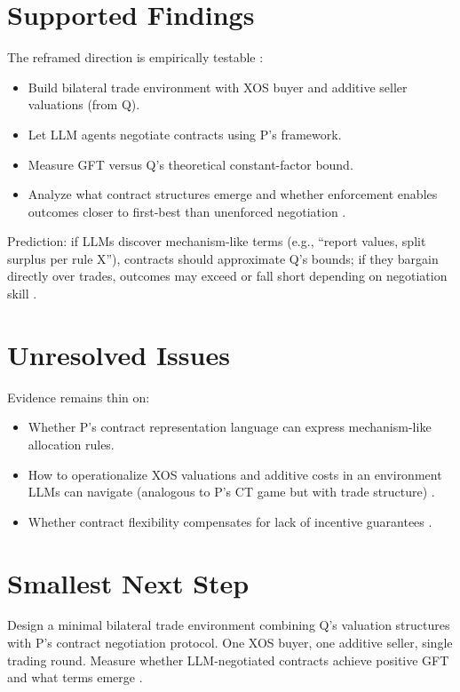\documentclass{article}
\begin{document}
\section*{Supported Findings}

The reframed direction is empirically testable :

\begin{itemize}
  \item Build bilateral trade environment with XOS buyer and additive seller valuations (from Q).
  \item Let LLM agents negotiate contracts using P's framework.
  \item Measure GFT versus Q's theoretical constant-factor bound.
  \item Analyze what contract structures emerge and whether enforcement enables outcomes closer to first-best than unenforced negotiation .
\end{itemize}

Prediction: if LLMs discover mechanism-like terms (e.g., ``report values, split surplus per rule X''), contracts should approximate Q's bounds; if they bargain directly over trades, outcomes may exceed or fall short depending on negotiation skill .

\section*{Unresolved Issues}

Evidence remains thin on:

\begin{itemize}
  \item Whether P's contract representation language can express mechanism-like allocation rules.
  \item How to operationalize XOS valuations and additive costs in an environment LLMs can navigate (analogous to P's CT game but with trade structure) .
  \item Whether contract flexibility compensates for lack of incentive guarantees .
\end{itemize}

\section*{Smallest Next Step}

Design a minimal bilateral trade environment combining Q's valuation structures with P's contract negotiation protocol. One XOS buyer, one additive seller, single trading round. Measure whether LLM-negotiated contracts achieve positive GFT and what terms emerge .
\end{document}
